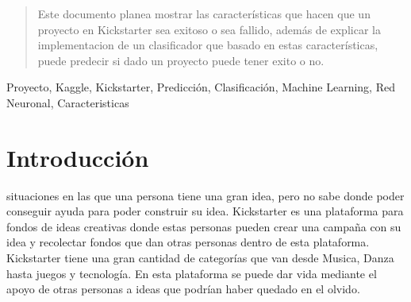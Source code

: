 \documentclass[journal]{IEEEtran}
\begin{document}




\maketitle

\begin{abstract}
Este documento planea mostrar las características que hacen que un proyecto en Kickstarter sea exitoso o sea fallido, además de explicar la implementacion de un clasificador que basado en estas características, puede predecir si dado un proyecto puede tener exito o no.
\end{abstract}

\begin{IEEEkeywords}
Proyecto, Kaggle, Kickstarter, Predicción, Clasificación, Machine Learning, Red Neuronal, Caracteristicas
\end{IEEEkeywords}






%
\IEEEpeerreviewmaketitle



\section{Introducción}
% 
% 
% 
% 
 situaciones en las que una persona tiene una gran idea, pero no sabe donde poder conseguir ayuda para poder construir su idea. Kickstarter es una plataforma para fondos de ideas creativas donde estas personas pueden crear una campaña con su idea y recolectar fondos que dan otras personas dentro de esta plataforma. Kickstarter tiene una gran cantidad de categorías que van desde Musica, Danza hasta juegos y tecnología. En esta plataforma se puede dar vida mediante el apoyo de otras personas a ideas que podrían haber quedado en el olvido.
\end{document}
